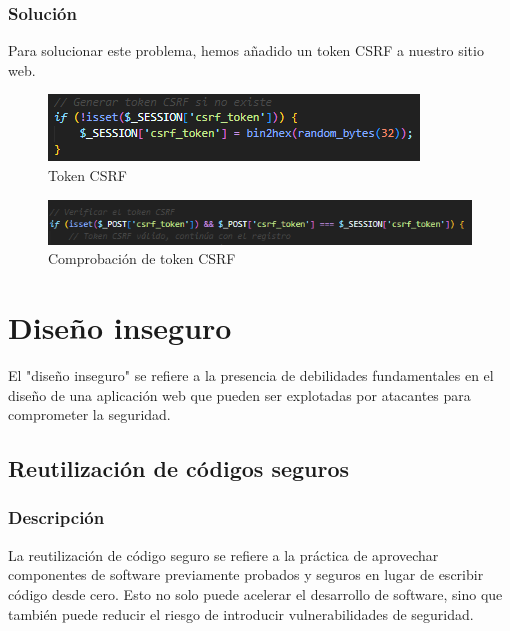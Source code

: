 \documentclass{report}
\begin{document}
                \subsubsection{Solución}
                    Para solucionar este problema, hemos añadido un token CSRF a nuestro sitio web.
                    \begin{figure}[H]
                        \centering
                        \includegraphics[width=\textwidth]{./img/vulnerabilidades/3.3/3.1.png}
                        \caption{Token CSRF}
                    \end{figure}
                    \begin{figure}[H]
                        \centering
                        \includegraphics[width=\textwidth]{./img/vulnerabilidades/3.3/3.2.png}
                        \caption{Comprobación de token CSRF}
                    \end{figure}
            \clearpage
        \section{Diseño inseguro}
            El "diseño inseguro" se refiere a la presencia de debilidades fundamentales en el diseño de una aplicación web que pueden ser explotadas por atacantes para comprometer la seguridad.
            \subsection{Reutilización de códigos seguros}
                \subsubsection{Descripción}
                    La reutilización de código seguro se refiere a la práctica de aprovechar componentes de software previamente probados y seguros en lugar de escribir código desde cero. Esto no solo puede acelerar el desarrollo de software, sino que también puede reducir el riesgo de introducir vulnerabilidades de seguridad.
\end{document}
